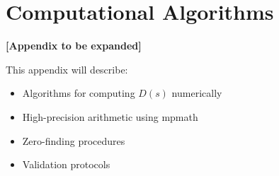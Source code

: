 \section{Computational Algorithms}
\label{app:algorithms}

\textbf{[Appendix to be expanded]}

This appendix will describe:
\begin{itemize}
\item Algorithms for computing $D(s)$ numerically
\item High-precision arithmetic using mpmath
\item Zero-finding procedures
\item Validation protocols
\end{itemize}
